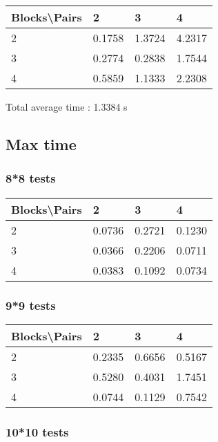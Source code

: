 \documentclass[12pt, a4paper]{article}
\begin{document}
				\begin{tabular}[h]{|l|l|l|l|}
				\hline
				Blocks\textbackslash Pairs & 2 & 3 & 4 \\
				\hline
				2 & 0.1758 & 1.3724 & 4.2317 \\
				\hline
				3 & 0.2774 & 0.2838 & 1.7544 \\
				\hline
				4 & 0.5859 & 1.1333 & 2.2308 \\
				\hline
				\end{tabular}

				Total average time : 1.3384 s

		\subsection{Max time}

			\subsubsection{8*8 tests}

				\begin{tabular}[h]{|l|l|l|l|}
				\hline
				Blocks\textbackslash Pairs & 2 & 3 & 4 \\
				\hline
				2 & 0.0736 & 0.2721 & 0.1230 \\
				\hline
				3 & 0.0366 & 0.2206 & 0.0711 \\
				\hline
				4 & 0.0383 & 0.1092 & 0.0734 \\
				\hline
				\end{tabular}

			\subsubsection{9*9 tests}

				\begin{tabular}[h]{|l|l|l|l|}
				\hline
				Blocks\textbackslash Pairs & 2 & 3 & 4 \\
				\hline
				2 & 0.2335 & 0.6656 & 0.5167 \\
				\hline
				3 & 0.5280 & 0.4031 & 1.7451 \\
				\hline
				4 & 0.0744 & 0.1129 & 0.7542 \\
				\hline
				\end{tabular}

			\subsubsection{10*10 tests}
\end{document}
